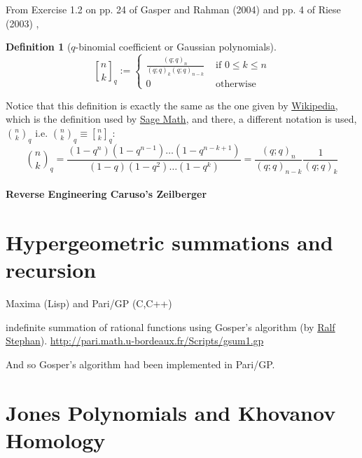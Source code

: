 \documentclass[10pt]{amsart}
\newtheorem{definition}{Definition}
\begin{document}
\begin{multicols*}{2}
From Exercise 1.2 on pp. 24 of Gasper and Rahman (2004) \cite{GGasperMRahman2004} and pp. 4 of Riese (2003) \cite{ARiese2003}, 
\begin{definition}[$q$-binomial coefficient or Gaussian polynomials]
\begin{equation}
  {n \brack k}_q := \begin{cases} \frac{ (q;q)_n }{ (q;q)_k (q;q)_{n-k} } & \text{ if } 0 \leq k \leq n \\
    0 & \text{ otherwise } \end{cases} 
\end{equation}
\end{definition} Notice that this definition is exactly the same as the one given by \href{https://en.wikipedia.org/wiki/Gaussian_binomial_coefficient}{Wikipedia}, which is the definition used by \href{http://doc.sagemath.org/html/en/reference/combinat/sage/combinat/q_analogues.html}{Sage Math}, and there, a different notation is used, $\binom{n}{k}_q$ i.e. $\binom{n}{k}_q \equiv {n \brack k}_q$:
\[
\binom{n}{k}_q = \frac{(1-q^n)(1-q^{n-1})\dots (1-q^{n-k+1}) }{ (1-q)(1-q^2 ) \dots (1-q^k) } = \frac{(q;q)_n}{(q;q)_{n-k} } \frac{1}{(q;q)_k}
\]



\subsection{Reverse Engineering Caruso's Zeilberger\cite{FCaruso1999}}

\part{Hypergeometric summations and recursion}

Maxima (Lisp) and Pari/GP (C,C++)



\cite{PWZ97}



indefinite summation of rational functions using Gosper's algorithm (by \href{http://www.ark.in-berlin.de/}{Ralf Stephan}).
\url{http://pari.math.u-bordeaux.fr/Scripts/gsum1.gp} 

And so Gosper's algorithm had been implemented in Pari/GP.

\part{Jones Polynomials and Khovanov Homology}



\end{multicols*}
\end{document}
